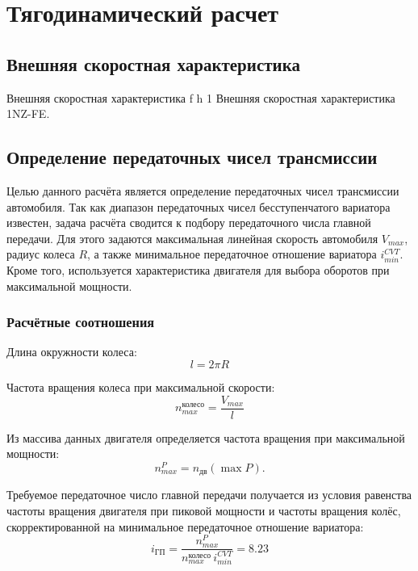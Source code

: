 \chapter{Тягодинамический расчет}

\section{Внешняя скоростная характеристика}

    {Внешняя скоростная характеристика} %
    {f} %
    {h} %
    {1\textwidth} %
    {Внешняя скоростная характеристика 1NZ-FE.} %

\section{Определение передаточных чисел трансмиссии}

Целью данного расчёта является определение передаточных чисел трансмиссии автомобиля. Так как диапазон передаточных чисел бесступенчатого вариатора известен, задача расчёта сводится к подбору передаточного числа главной передачи. Для этого задаются максимальная линейная скорость автомобиля $V_{max}$, радиус колеса $R$, а также минимальное передаточное отношение вариатора $i_{min}^{CVT}$. Кроме того, используется характеристика двигателя для выбора оборотов при максимальной мощности.

\subsection*{Расчётные соотношения}

Длина окружности колеса:
\[
l = 2\pi R
\]

Частота вращения колеса при максимальной скорости:
\[
n_{max}^{\text{колесо}} = \frac{V_{max}}{l}
\]

Из массива данных двигателя определяется частота вращения при максимальной мощности:
\[
n_{max}^{P} = n_{\text{дв}}(\max P).
\]

Требуемое передаточное число главной передачи получается из условия равенства частоты вращения двигателя при пиковой мощности и частоты вращения колёс, скорректированной на минимальное передаточное отношение вариатора:
\[
i_{\text{ГП}} = \frac{n_{max}^{P}}{n_{max}^{\text{колесо}} \, i_{min}^{CVT}} = 8.23
\]

